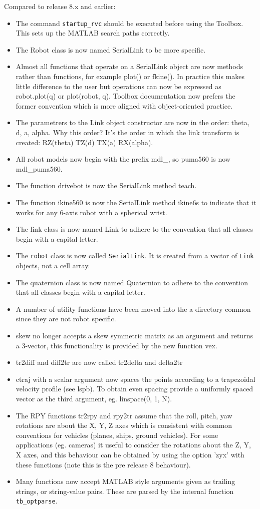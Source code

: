 \documentclass[a4paper]{report}
\begin{document}
Compared to release 8.x and earlier:
\begin{itemize}
\item The command \texttt{startup\_rvc} should be executed before using the Toolbox.  This sets up the MATLAB search paths correctly.
\item The Robot class is now named SerialLink to be more specific.
\item Almost all functions that operate on a SerialLink object are now methods rather than functions, for example plot() or fkine(). In practice this makes little difference to the user but operations can now be expressed as robot.plot(q) or plot(robot, q). Toolbox documentation now prefers the former convention which is more aligned with object-oriented practice.
\item The parametrers to the Link object constructor are now in the order: theta, d, a, alpha. Why this order? It's the order in which the link transform is created: RZ(theta) TZ(d) TX(a) RX(alpha).
\item All robot models now begin with the prefix mdl\_, so puma560 is now mdl\_puma560.
\item The function drivebot is now the SerialLink method teach.
\item The function ikine560 is now the SerialLink method ikine6s to indicate that it works for any 6-axis robot with a spherical wrist.
\item The link class is now named Link to adhere to the convention that all classes begin with a capital letter.
\item The \texttt{robot} class is now called \texttt{SerialLink}.  It is created from a vector of \texttt{Link} objects, not a cell array.
\item The quaternion class is now named Quaternion to adhere to the convention that all classes begin with a capital letter.
\item A number of utility functions have been moved into the a directory common since they are not robot specific.
\item skew no longer accepts a skew symmetric matrix as an argument and returns a 3-vector, this functionality is provided by the new function vex.
\item tr2diff and diff2tr are now called tr2delta and delta2tr
\item ctraj with a scalar argument now spaces the points according to a trapezoidal velocity profile (see lspb). To obtain even spacing provide a uniformly spaced vector as the third argument, eg. linspace(0, 1, N).
\item The RPY functions tr2rpy and rpy2tr assume that the roll, pitch, yaw rotations are about the X, Y, Z axes which is consistent with common conventions for vehicles (planes, ships, ground vehicles). For some applications (eg. cameras) it useful to consider the rotations about the Z, Y, X axes, and this behaviour can be obtained by using the option 'zyx' with these functions (note this is the pre release 8 behaviour).
\item Many functions now accept MATLAB style arguments given as trailing strings, or string-value pairs.  These are parsed by the internal
function \texttt{tb\_optparse}.
\end{itemize}
\end{document}
